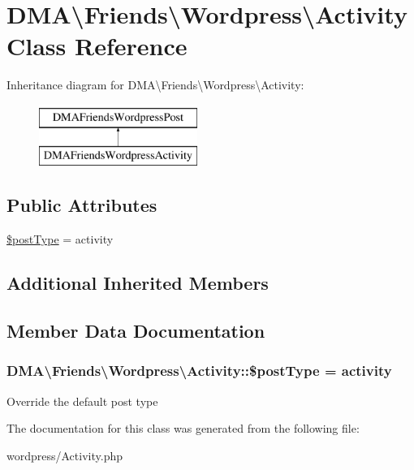 \hypertarget{classDMA_1_1Friends_1_1Wordpress_1_1Activity}{}\section{D\+M\+A\textbackslash{}Friends\textbackslash{}Wordpress\textbackslash{}Activity Class Reference}
\label{classDMA_1_1Friends_1_1Wordpress_1_1Activity}
Inheritance diagram for D\+M\+A\textbackslash{}Friends\textbackslash{}Wordpress\textbackslash{}Activity\+:\begin{figure}[H]
\begin{center}
\leavevmode
\includegraphics[height=2.000000cm]{de/d54/classDMA_1_1Friends_1_1Wordpress_1_1Activity}
\end{center}
\end{figure}
\subsection*{Public Attributes}
\begin{DoxyCompactItemize}
\item 
\hyperlink{classDMA_1_1Friends_1_1Wordpress_1_1Activity_a06a7b4fad854f04e2282f92e9829c3d3}{\$post\+Type} = \textquotesingle{}activity\textquotesingle{}
\end{DoxyCompactItemize}
\subsection*{Additional Inherited Members}


\subsection{Member Data Documentation}
\hypertarget{classDMA_1_1Friends_1_1Wordpress_1_1Activity_a06a7b4fad854f04e2282f92e9829c3d3}{}
\subsubsection[{\$post\+Type}]{\setlength{\rightskip}{0pt plus 5cm}D\+M\+A\textbackslash{}\+Friends\textbackslash{}\+Wordpress\textbackslash{}\+Activity\+::\$post\+Type = \textquotesingle{}activity\textquotesingle{}}\label{classDMA_1_1Friends_1_1Wordpress_1_1Activity_a06a7b4fad854f04e2282f92e9829c3d3}
Override the default post type 

The documentation for this class was generated from the following file\+:\begin{DoxyCompactItemize}
\item 
wordpress/Activity.\+php\end{DoxyCompactItemize}
